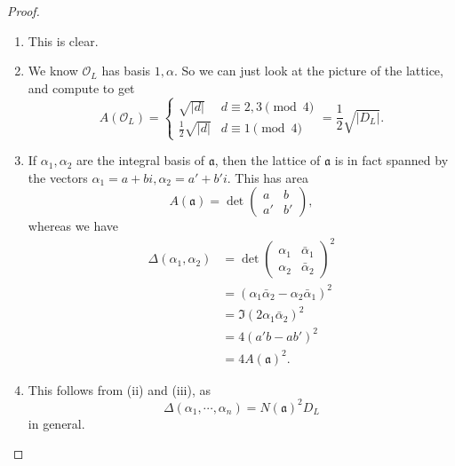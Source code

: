 \documentclass[a4paper]{article}
\begin{document}
\begin{proof}\leavevmode
  \begin{enumerate}
    \item This is clear.
    \item We know $\mathcal{O}_L$ has basis $1, \alpha$. So we can just look at the picture of the lattice, and compute to get
      \[
        A(\mathcal{O}_L) =
        \begin{cases}
          \sqrt{|d|} & d \equiv 2, 3 \pmod 4\\
          \frac{1}{2}\sqrt{|d|} & d \equiv 1\pmod 4
        \end{cases} = \frac{1}{2}\sqrt{|D_L|}.
      \]
    \item If $\alpha_1, \alpha_2$ are the integral basis of $\mathfrak{a}$, then the lattice of $\mathfrak{a}$ is in fact spanned by the vectors $\alpha_1 = a + bi, \alpha_2 = a' + b' i$. This has area
      \[
        A(\mathfrak{a}) = \det
        \begin{pmatrix}
          a & b\\
          a' & b'
        \end{pmatrix},
      \]
      whereas we have
      \begin{align*}
        \Delta(\alpha_1, \alpha_2) &=
        \det
        \begin{pmatrix}
          \alpha_1 & \bar{\alpha}_1\\
          \alpha_2 & \bar{\alpha}_2
        \end{pmatrix}^2\\
        &= (\alpha_1 \bar{\alpha}_2 - \alpha_2 \bar{\alpha}_1)^2\\
        &= \Im(2\alpha_1 \bar{\alpha}_2)^2\\
        &= 4(a'b - ab')^2\\
        &= 4A(\mathfrak{a})^2.
      \end{align*}
    \item This follows from (ii) and (iii), as
      \[
        \Delta(\alpha_1, \cdots, \alpha_n) = N(\mathfrak{a})^2 D_L
      \]
      in general.
  \end{enumerate}
\end{proof}
\end{document}
